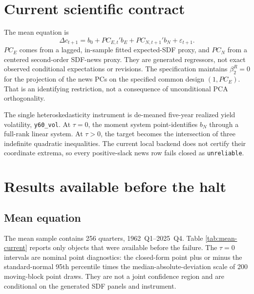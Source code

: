 \documentclass[11pt]{article}
\begin{document}
\section{Current scientific contract}

The mean equation is
\[
  \Delta c_{t+1}
  =b_0+PC_{E,t}'b_E+PC_{N,t+1}'b_N+\varepsilon_{t+1}.
\]
$PC_E$ comes from a lagged, in-sample fitted expected-SDF proxy, and $PC_N$
from a centered second-order SDF-news proxy. They are generated regressors,
not exact observed conditional expectations or revisions. The specification
maintains $\beta_2^R=0$ for the projection of the news PCs on the specified
common design $(1,PC_E)$. That is an identifying restriction, not a
consequence of unconditional PCA orthogonality.

The single heteroskedasticity instrument is de-meaned five-year realized yield
volatility, \texttt{y60\_vol}. At $\tau=0$, the moment system point-identifies
$b_N$ through a full-rank linear system. At $\tau>0$, the target becomes the
intersection of three indefinite quadratic inequalities. The current local
backend does not certify their coordinate extrema, so every positive-slack
news row fails closed as \texttt{unreliable}.

\section{Results available before the halt}

\subsection{Mean equation}

The mean sample contains 256 quarters, 1962~Q1--2025~Q4. Table
\ref{tab:mean-current} reports only objects that were available before the
failure. The $\tau=0$ intervals are nominal point diagnostics: the closed-form
point plus or minus the standard-normal 95th percentile times the
median-absolute-deviation scale of 200 moving-block point draws. They are not
a joint confidence region and are conditional on the generated SDF panels and
instrument.
\end{document}
